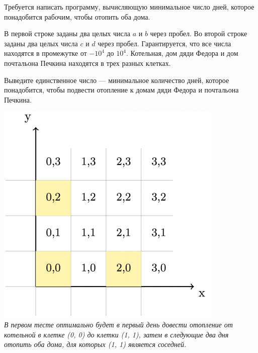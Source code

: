\begin{problem}
Требуется написать программу, вычисляющую минимальное число дней, которое понадобится рабочим, чтобы отопить оба дома.

\InputFile

В первой строке заданы два целых числа $a$ и $b$ через пробел. Во второй строке заданы два целых числа $c$ и $d$ через пробел. Гарантируется, что все числа находятся в промежутке от $-10^4$ до $10^4$. Котельная, дом дяди Федора и дом почтальона Печкина находятся в трех разных клетках.

\OutputFile

Выведите единственное число — минимальное количество дней, которое понадобится, чтобы подвести отопление к домам дяди Федора и почтальона Печкина.

\Examples

\begin{example}
%
%
\end{example}

\Explanations

\begin{center}
\includegraphics[scale=0.5]{images/3.png}\\
\textit{В первом тесте оптимально будет в первый день довести отопление от котельной в клетке (0, 0) до клетки (1, 1), затем в следующие два дня отопить оба дома, для
которых (1, 1) является соседней.}
\end{center}


\end{problem}
